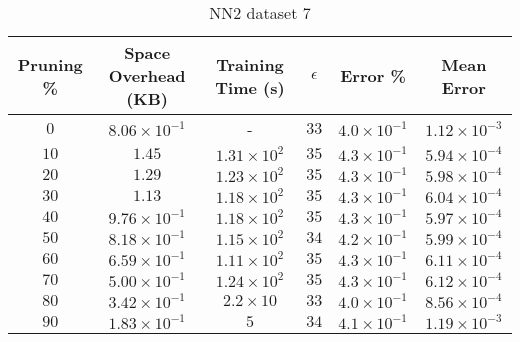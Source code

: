 \begin{adjustwidth}{0cm}{}
\begin{table}
\caption{NN2 dataset 7}\label{pr27}
\begin{tabular}{cccccc}
\hline
\toprule
Pruning \% & Space Overhead (KB) & Training Time (s) & $\epsilon$ & Error \% & Mean Error\\
\midrule
$0$ & $8.06 \times 10^{-1}$ & - & $33$ & $4.0 \times 10^{-1}$ & $1.12 \times 10^{-3}$\\
$10$ & $1.45$ & $1.31 \times 10^{2}$ & $35$ & $4.3 \times 10^{-1}$ & $5.94 \times 10^{-4}$\\
$20$ & $1.29$ & $1.23 \times 10^{2}$ & $35$ & $4.3 \times 10^{-1}$ & $5.98 \times 10^{-4}$\\
$30$ & $1.13$ & $1.18 \times 10^{2}$ & $35$ & $4.3 \times 10^{-1}$ & $6.04 \times 10^{-4}$\\
$40$ & $9.76 \times 10^{-1}$ & $1.18 \times 10^{2}$ & $35$ & $4.3 \times 10^{-1}$ & $5.97 \times 10^{-4}$\\
$50$ & $8.18 \times 10^{-1}$ & $1.15 \times 10^{2}$ & $34$ & $4.2 \times 10^{-1}$ & $5.99 \times 10^{-4}$\\
$60$ & $6.59 \times 10^{-1}$ & $1.11 \times 10^{2}$ & $35$ & $4.3 \times 10^{-1}$ & $6.11 \times 10^{-4}$\\
$70$ & $5.00 \times 10^{-1}$ & $1.24 \times 10^{2}$ & $35$ & $4.3 \times 10^{-1}$ & $6.12 \times 10^{-4}$\\
$80$ & $3.42 \times 10^{-1}$ & $2.2 \times 10$ & $33$ & $4.0 \times 10^{-1}$ & $8.56 \times 10^{-4}$\\
$90$ & $1.83 \times 10^{-1}$ & $5$ & $34$ & $4.1 \times 10^{-1}$ & $1.19 \times 10^{-3}$\\
\bottomrule
\end{tabular}
\end{table}
\end{adjustwidth}

\null\par\null

